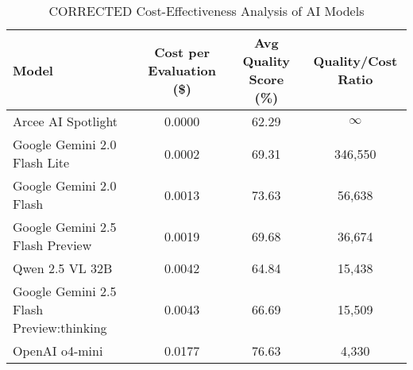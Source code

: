 \documentclass{article}
\begin{document}
\begin{table}[htbp]
\centering
\caption{CORRECTED Cost-Effectiveness Analysis of AI Models}
\label{tab:cost_effectiveness_corrected}
\begin{tabular}{@{}lccc@{}}
\toprule
\textbf{Model} & \textbf{Cost per Evaluation (\$)} & \textbf{Avg Quality Score (\%)} & \textbf{Quality/Cost Ratio} \\
\midrule
Arcee AI Spotlight & 0.0000 & 62.29 & $\infty$ \\
Google Gemini 2.0 Flash Lite & 0.0002 & 69.31 & 346,550 \\
Google Gemini 2.0 Flash & 0.0013 & 73.63 & 56,638 \\
Google Gemini 2.5 Flash Preview & 0.0019 & 69.68 & 36,674 \\
Qwen 2.5 VL 32B & 0.0042 & 64.84 & 15,438 \\
Google Gemini 2.5 Flash Preview:thinking & 0.0043 & 66.69 & 15,509 \\
OpenAI o4-mini & 0.0177 & 76.63 & 4,330 \\
\bottomrule
\end{tabular}
\end{table}
\end{document}

